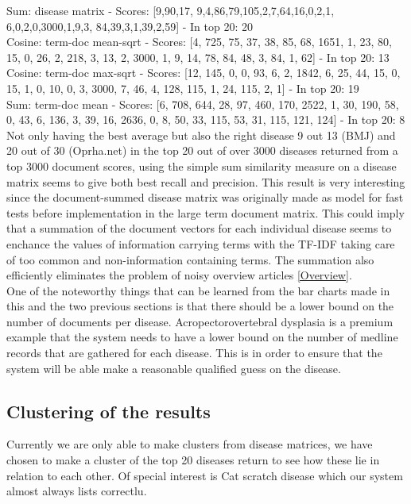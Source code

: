 {\small
Sum: disease matrix - Scores: [9,90,17, 9,4,86,79,105,2,7,64,16,0,2,1, 6,0,2,0,3000,1,9,3, 84,39,3,1,39,2,59] - In top 20: 20 \\
Cosine: term-doc mean-sqrt - Scores: [4, 725, 75, 37, 38, 85, 68, 1651, 1, 23, 80, 15, 0, 26, 2, 218, 3, 13, 2, 3000, 1, 9, 14, 78, 84, 48, 3, 84, 1, 62] - In top 20: 13 \\
Cosine: term-doc max-sqrt - Scores: [12, 145, 0, 0, 93, 6, 2, 1842, 6, 25, 44, 15, 0, 15, 1, 0, 10, 0, 3, 3000, 7, 46, 4, 128, 115, 1, 24, 115, 2, 1] - In top 20: 19 \\
Sum: term-doc mean - Scores: [6, 708, 644, 28, 97, 460, 170, 2522, 1, 30, 190, 58, 0, 43, 6, 136, 3, 39, 16, 2636, 0, 8, 50, 33, 115, 53, 31, 115, 121, 124] - In top 20: 8
}
Not only having the best average but also the right disease 9 out 13 (BMJ) and 20 out of 30 (Oprha.net) in the top 20 out of over 3000 diseases returned from a top 3000 document scores, using the simple sum similarity measure on a disease matrix seems to give both best recall and precision. This result is very interesting since the document-summed disease matrix was originally made as model for fast tests before implementation in the large term document matrix. This could imply that a summation of the document vectors for each individual disease seems to enchance the values of information carrying terms with the TF-IDF taking care of too common and non-information containing terms. The summation also efficiently eliminates the problem of noisy overview articles \ref{Overview}. \\

One of the noteworthy things that can be learned from the bar charts made in this and the two previous sections is that there should be a lower bound on the number of documents per disease. Acropectorovertebral dysplasia is a premium example that the system needs to have a lower bound on the number of medline records that are gathered for each disease. This is in order to ensure that the system will be able make a reasonable qualified guess on the disease.

\subsection{Clustering of the results}
Currently we are only able to make clusters from disease matrices, we have chosen to make a cluster of the top 20 diseases return to see how these lie in relation to each other. Of special interest is Cat scratch disease which our system almost always lists correctlu. %

